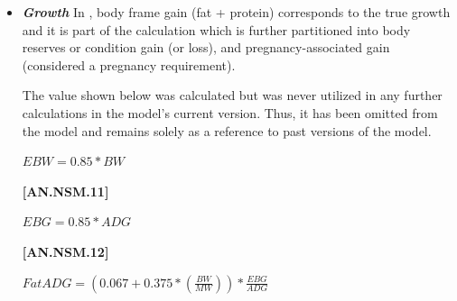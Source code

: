 \documentclass{article}
\begin{document}
\begin{refsection}
\begin{itemize}
\begin{center}
    \(NEa3 = 0.0067 * \frac{(EnvTopoParlor)}{1000} * BW\) 
\end{center}
\vspace{0.5cm}
            {\raggedleft \textbf{[AN.NSM.9]}\par}
            \vspace{0.2cm}
            
\begin{center}
    \(NEa = NEa1 + NEa2 + NEa3\) 
\end{center}
\vspace{0.5cm}

            {\raggedleft \textbf{[AN.NSM.10]}\par}
            \vspace{0.2cm}     

        \item \textbf{\textit {Growth}} In \textcite{nrc2021}, body frame gain (fat + protein) corresponds to the true growth and it is part of the calculation which is further partitioned into body reserves or condition gain (or loss), and pregnancy-associated gain (considered a pregnancy requirement). 
        \vspace{0.15cm}

        The value shown below was calculated but was never utilized in any further calculations in the model’s current version. Thus, it has been omitted from the model and remains solely as a reference to past versions of the model.
\vspace{0.5cm}

\begin{center}
    \(EBW = 0.85 * BW\) 
\end{center}
\vspace{0.5cm}

            {\raggedleft \textbf{[AN.NSM.11]}\par}
            \vspace{0.2cm} 
            
\begin{center}
    \(EBG = 0.85 * ADG\) 
\end{center}
\vspace{0.5cm}

            {\raggedleft \textbf{[AN.NSM.12]}\par}
            \vspace{0.2cm} 

\begin{center}
    \(FatADG = (0.067 + 0.375 * (\frac{BW}{MW})) * \frac{EBG}{ADG}\) 
\end{center}
\vspace{0.5cm}


\end{itemize}
\end{refsection}
\end{document}
